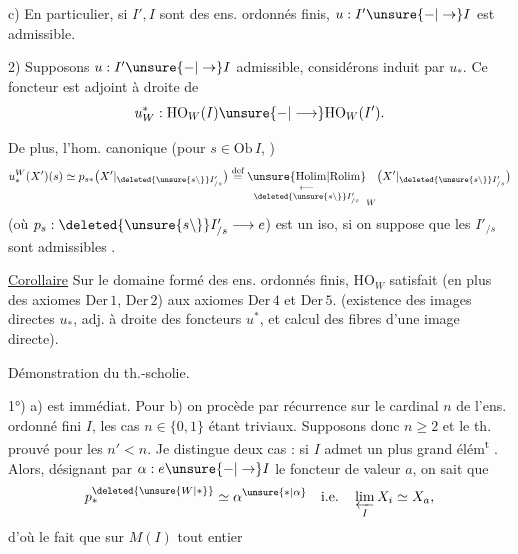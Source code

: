 c) En particulier, si $I',I$  sont des ens. ordonnés finis,  $u:I'\unsure{-|\to}I$ est admissible.

2) Supposons $u:I'\unsure{-|\to}I$ admissible,   considérons
induit par $u_*$. Ce foncteur est adjoint à droite de
\[
u_W^*:\mathrm{HO}_W(I)\unsure{-|\longrightarrow}\mathrm{HO}_W(I').
\]

De plus, l'hom. canonique (pour $s\in\mathrm{Ob}\,I$, )
\[
u_*^W(X')(s)\simeq p_{s*}\bigl(X'|_{\deleted{\unsure{s\backslash}}I'_{/s}}\bigr)
\overset{\text{def}}{=}
\underset{\deleted{\unsure{s\backslash}}I'_{/s}}{\underset{\longleftarrow}{\operatorname{\unsure{Holim|Rolim}}}}_W\bigl(X'|_{\deleted{\unsure{s\backslash}}I'_{/s}}\bigr)
\]
(où $p_s:\deleted{\unsure{s\backslash}}I'_{/s}\longrightarrow e$) est un iso, si on suppose que les $I'_{/s}$ sont admissibles  .

\uline{Corollaire} Sur le domaine formé des ens. ordonnés finis,  $\mathrm{HO}_W$ satisfait (en plus des axiomes $\mathrm{Der}\,1$, $\mathrm{Der}\,2$) aux axiomes $\mathrm{Der}\,4$ et $\mathrm{Der}\,5$. (existence des images directes $u_*$, adj. à droite des foncteurs $u^*$, et calcul  des fibres d'une image directe).

Démonstration du th.-scholie.

1°) a) est immédiat. Pour b) on procède par récurrence sur le cardinal $n$ de l'ens. ordonné fini $I$, les cas $n\in\{0,1\}$ étant triviaux. Supposons donc $n\geq2$ et le th. prouvé pour les $n'<n$. Je distingue deux cas : si $I$ admet un plus grand élém\textsuperscript{t} . Alors, désignant par $\alpha:e\unsure{-|\to}I$ le foncteur de valeur $a$,  on sait que
\[
p_*^{\deleted{\unsure{W|*}}}\simeq\alpha^{\unsure{*|\alpha}}\quad\text{i.e.}\quad\varprojlim_I X_i\simeq X_a,
\]
d'où le fait que sur $M(I)$ tout entier

